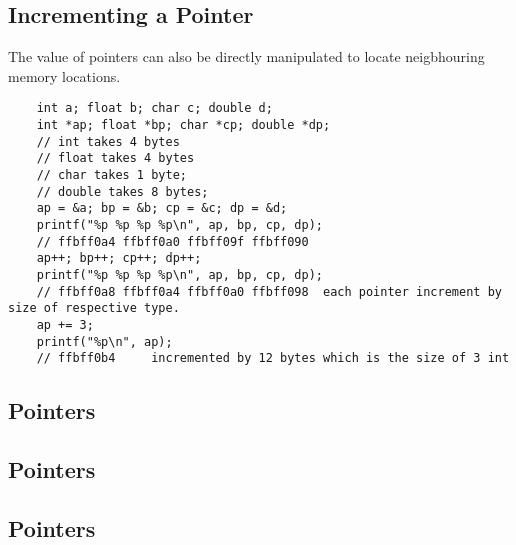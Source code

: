 \documentclass[12pt]{article} %
\begin{document}
\subsection{Incrementing a Pointer}
The value of pointers can also be directly manipulated to locate neigbhouring memory locations.
\begin{lstlisting}
    int a; float b; char c; double d;
    int *ap; float *bp; char *cp; double *dp;
    // int takes 4 bytes
    // float takes 4 bytes
    // char takes 1 byte;
    // double takes 8 bytes;
    ap = &a; bp = &b; cp = &c; dp = &d;
    printf("%p %p %p %p\n", ap, bp, cp, dp); 
    // ffbff0a4 ffbff0a0 ffbff09f ffbff090
    ap++; bp++; cp++; dp++;
    printf("%p %p %p %p\n", ap, bp, cp, dp);
    // ffbff0a8 ffbff0a4 ffbff0a0 ffbff098  each pointer increment by size of respective type.
    ap += 3;
    printf("%p\n", ap);
    // ffbff0b4     incremented by 12 bytes which is the size of 3 int
\end{lstlisting}
\subsection{Pointers}
\subsection{Pointers}
\subsection{Pointers}
\end{document}
